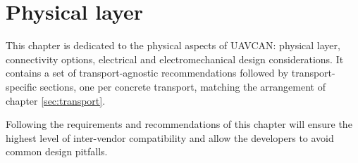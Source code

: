 \chapter{Physical layer}\label{sec:physical}

This chapter is dedicated to the physical aspects of UAVCAN:
physical layer, connectivity options, electrical and electromechanical design considerations.
It contains a set of transport-agnostic recommendations followed by transport-specific sections,
one per concrete transport, matching the arrangement of chapter \ref{sec:transport}.

Following the requirements and recommendations of this chapter will ensure the highest level of
inter-vendor compatibility and allow the developers to avoid common design pitfalls.

\clearpage
\clearpage
